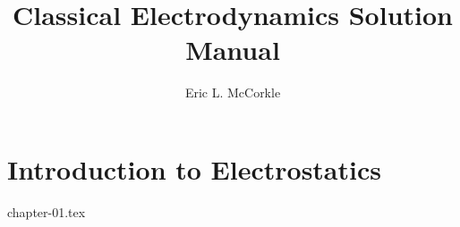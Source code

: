 \documentclass{report}
\title{Classical Electrodynamics Solution Manual}
\author{Eric L. McCorkle}
\begin{document}
\maketitle
\tableofcontents

\chapter{Introduction to Electrostatics}

{chapter-01.tex}
\end{document}
